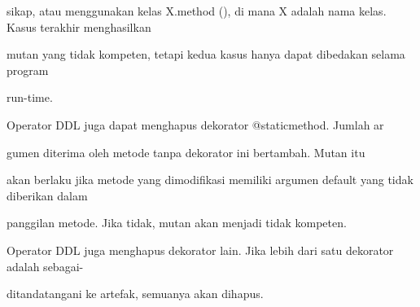 \documentclass[12pt,a4paper]{article}
\begin{document}
sikap, atau menggunakan kelas X.method (), di mana X adalah nama kelas. Kasus terakhir menghasilkan

mutan yang tidak kompeten, tetapi kedua kasus hanya dapat dibedakan selama program

run-time.

Operator DDL juga dapat menghapus dekorator @staticmethod. Jumlah ar

gumen diterima oleh metode tanpa dekorator ini bertambah. Mutan itu

akan berlaku jika metode yang dimodifikasi memiliki argumen default yang tidak diberikan dalam

panggilan metode. Jika tidak, mutan akan menjadi tidak kompeten.

Operator DDL juga menghapus dekorator lain. Jika lebih dari satu dekorator adalah sebagai-

ditandatangani ke artefak, semuanya akan dihapus.
\end{document}
